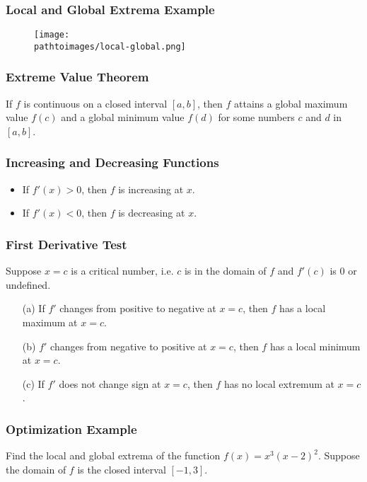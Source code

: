 \documentclass{beamer}
\newcommand{\pathtoimages}{/Users/charlesrambo/Desktop/Bootcamp24/Images}
\begin{document}
\begin{frame}
\frametitle{Local and Global Extrema Example}

\begin{figure}
\centering
\texttt{[image: \\pathtoimages/local-global.png]}
\end{figure}



\end{frame}

\begin{frame}
\frametitle{Extreme Value Theorem}

\begin{Theorem}
If $f$ is continuous on a closed interval $[a, b]$, then $f$ attains a global maximum value $f(c)$ and a global minimum value $f(d)$ for some numbers $c$ and $d$ in $[a, b]$.
\end{Theorem}

\end{frame}

\begin{frame}[t]
\frametitle{Increasing and Decreasing Functions}

\begin{itemize}
\item If $f'(x) > 0 $, then $f$ is increasing at $x$.
\item If $f' (x) < 0$, then $f$ is decreasing at $x$.
\end{itemize}

\end{frame}

\begin{frame}
\frametitle{First Derivative Test}
Suppose $x = c$ is a critical number, i.e. $c$ is in the domain of $f$ and $f'(c)$ is 0 or undefined.
\begin{itemize}
\item[(a)] If $f'$ changes from positive to negative at $x = c$, then $f$ has a local maximum at $x = c$.
\item[(b)] $f'$ changes from negative to positive at $x = c$, then $f$ has a local minimum at $x = c$.
\item[(c)] If $f'$ does not change sign at $x = c$, then $f$ has no local extremum at $x = c$.
\end{itemize}
\end{frame}

\begin{frame}[t]
\frametitle{Optimization Example}
\small
\begin{Example}
Find the local and global extrema of the function $f(x) = x^3(x-2)^2$. Suppose the domain of $f$ is the closed interval $[-1, 3]$.
\end{Example}
\end{frame}
\end{document}
